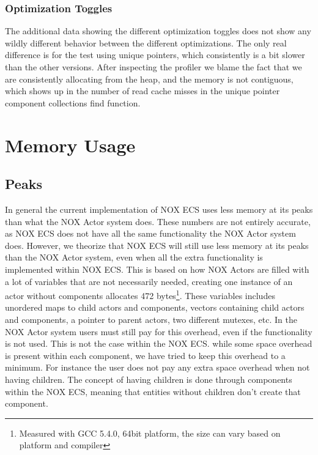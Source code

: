 \subsubsection{Optimization Toggles}
The additional data showing the different optimization toggles does not show any wildly different behavior
between the different optimizations. The only real difference is for the test using unique pointers,
which consistently is a bit slower than the other versions.
After inspecting the profiler we blame the fact that we are consistently allocating from the heap,
and the memory is not contiguous, which shows up in the number of read cache misses in the unique pointer
component collections find function.

\section{Memory Usage}
\subsection{Peaks}
In general the current implementation of NOX ECS uses less memory at its peaks than what the NOX Actor system does.
These numbers are not entirely accurate, as NOX ECS does not have all the same functionality the NOX Actor system does.
However, we theorize that NOX ECS will still use less memory at its peaks than the NOX Actor system, even when
all the extra functionality is implemented within NOX ECS.
This is based on how NOX Actors are filled with a lot of variables that are not necessarily needed,
creating one instance of an actor without components allocates 472 bytes\footnote{Measured with GCC 5.4.0, 64bit platform, the size can vary based on platform and compiler}.
These variables includes unordered maps to child actors and components, vectors containing child actors and components,
a pointer to parent actors, two different mutexes, etc.
In the NOX Actor system users must still pay for this overhead, even if the functionality is not used.
This is not the case within the NOX ECS.
while some space overhead is present within each component, we have tried to keep this overhead to a minimum.
For instance the user does not pay any extra space overhead when not having children.
The concept of having children is done through components within the NOX ECS, meaning that entities without children
don't create that component.

